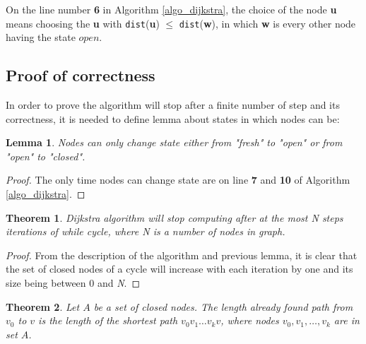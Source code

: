 \documentclass[thesis=M,english]{FITthesis}[2012/10/20]
\newtheorem{theorem}{Theorem}
\newtheorem{lemma}{Lemma}
\begin{document}
On the line number \textbf{6} in Algorithm \ref{algo_dijkstra}, the choice of the node \textbf{u} means choosing the \textbf{u} with \texttt{dist}(\textbf{u}) $ \leq $ \texttt{dist}(\textbf{w}), in which \textbf{w} is every other node having the state $open$.

\subsection{Proof of correctness}

In order to prove the algorithm will stop after a finite number of step and its correctness, it is needed to define lemma about states in which nodes can be:

\begin{lemma}
Nodes can only change state either from "\textit{fresh}" to "\textit{open}" or from "\textit{open}" to "\textit{closed}".
\end{lemma}

\begin{proof}
The only time nodes can change state are on line \textbf{7} and \textbf{10} of Algorithm \ref{algo_dijkstra}.
\end{proof}

\begin{theorem}
\label{theorem2}
Dijkstra algorithm will stop computing after at the most \textit{N} steps iterations of while cycle, where N is a number of nodes in graph. 
\end{theorem}

\begin{proof}
From the description of the algorithm and previous lemma, it is clear that the set of closed nodes of a cycle will increase with each iteration by one and its size being between 0 and \textit{N}.
\end{proof}

\begin{theorem}
Let $A$ be a set of closed nodes. The length already found path from $v_0$ to $v$ is the length of the shortest path $v_0 v_1 \dots v_k v$, where nodes $v_0, v_1, \dots , v_k$ are in set $A$.
\end{theorem}
\end{document}
